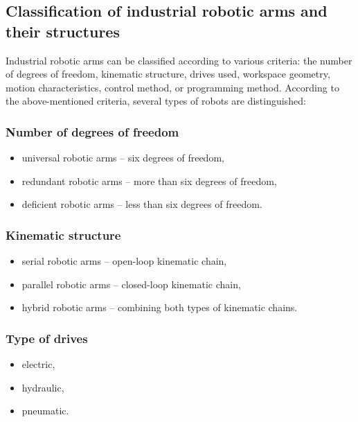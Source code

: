 
\subsection{Classification of industrial robotic arms and their structures}

Industrial robotic arms can be classified according to various criteria: the number of degrees of freedom, kinematic structure, drives used, workspace geometry, motion characteristics, control method, or programming method. According to the above-mentioned criteria, several types of robots are distinguished:

\subsubsection*{Number of degrees of freedom}

\begin{itemize}
    \item universal robotic arms -- six degrees of freedom,
    \item redundant robotic arms -- more than six degrees of freedom,
    \item deficient robotic arms -- less than six degrees of freedom.
\end{itemize}

\subsubsection*{Kinematic structure}

\begin{itemize}
    \item serial robotic arms -- open-loop kinematic chain,
    \item parallel robotic arms -- closed-loop kinematic chain,
    \item hybrid robotic arms -- combining both types of kinematic chains.
\end{itemize}


\subsubsection*{Type of drives}

\begin{itemize}
    \item electric,
    \item hydraulic,
    \item pneumatic.
\end{itemize}

